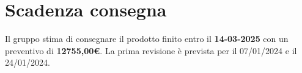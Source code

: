 \section{Scadenza consegna}

Il gruppo stima di consegnare il prodotto finito entro il \textbf{14-03-2025} con un preventivo di \textbf{12755,00\euro}. La prima revisione è prevista per il 07/01/2024 e il 24/01/2024.